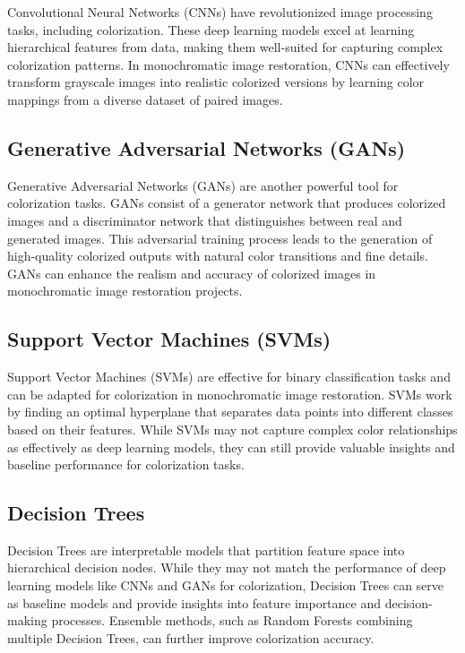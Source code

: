 Convolutional Neural Networks (CNNs) have revolutionized image processing tasks, including colorization. These deep learning models excel at learning hierarchical features from data, making them well-suited for capturing complex colorization patterns. In monochromatic image restoration, CNNs can effectively transform grayscale images into realistic colorized versions by learning color mappings from a diverse dataset of paired images.

\subsection{Generative Adversarial Networks (GANs)}

Generative Adversarial Networks (GANs) are another powerful tool for colorization tasks. GANs consist of a generator network that produces colorized images and a discriminator network that distinguishes between real and generated images. This adversarial training process leads to the generation of high-quality colorized outputs with natural color transitions and fine details. GANs can enhance the realism and accuracy of colorized images in monochromatic image restoration projects.



\subsection{Support Vector Machines (SVMs)}

Support Vector Machines (SVMs) are effective for binary classification tasks and can be adapted for colorization in monochromatic image restoration. SVMs work by finding an optimal hyperplane that separates data points into different classes based on their features. While SVMs may not capture complex color relationships as effectively as deep learning models, they can still provide valuable insights and baseline performance for colorization tasks.

\subsection{Decision Trees}

Decision Trees are interpretable models that partition feature space into hierarchical decision nodes. While they may not match the performance of deep learning models like CNNs and GANs for colorization, Decision Trees can serve as baseline models and provide insights into feature importance and decision-making processes. Ensemble methods, such as Random Forests combining multiple Decision Trees, can further improve colorization accuracy.

